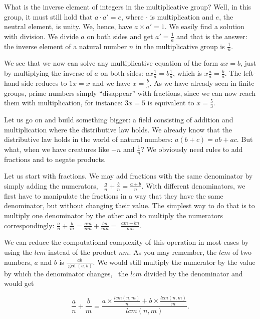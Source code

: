 \documentclass[tikz]{scrreprt}
\begin{document}
What is the inverse element of integers
in the multiplicative group?
Well, in this group, it must still hold
that $a \cdot a' = e$, where $\cdot$ is multiplication
and $e$, the neutral element, is unity.
We, hence, have $a \times a' = 1$.
We easily find a solution with division.
We divide $a$ on both sides and get $a' = \frac{1}{a}$
and that is the answer: 
the inverse element of a natural number $n$
in the multiplicative group
is $\frac{1}{n}$.

We see that we now can solve
any multiplicative equation of the form
$ax = b$, just by multiplying the inverse
of $a$ on both sides: $ax\frac{1}{a} = b \frac{1}{a}$,
which is $x\frac{a}{a} = \frac{b}{a}$.
The left-hand side reduces to $1x = x$
and we have $x = \frac{b}{a}$.
As we have already seen in finite groups,
prime numbers simply ``disappear'' with fractions,
since we can now reach them with multiplication,
for instance: $3x = 5$ is equivalent to
$x = \frac{5}{3}$.

Let us go on and build something bigger: a field
consisting of addition and multiplication
where the distributive law holds.
We already know that the distributive law
holds in the world of natural numbers:
$a(b + c) = ab + ac$.
But what, when we have creatures like $-n$ and 
$\frac{1}{n}$?
We obviously need rules to add fractions
and to negate products.

Let us start with fractions.
We may add fractions with the same denominator
by simply adding the numerators, \ie\
$\frac{a}{n} + \frac{b}{n} = \frac{a+b}{n}$.
With different denominators,
we first have to manipulate the fractions in a way
that they have the same denominator, but without 
changing their value.
The simplest way to do that
is to multiply one denominator by the other
and to multiply the numerators correspondingly:
$\frac{a}{n} + \frac{b}{m} = \frac{am}{nm} + \frac{bn}{mn} =$
$\frac{am+bn}{mn}$.

We can reduce the computational complexity
of this operation in most cases by using
the $lcm$ instead of the product $nm$.
As you may remember,
the $lcm$ of two numbers, $a$ and $b$ is 
$\frac{ab}{\gcd(a,b)}$.
We would still multiply the numerator 
by the value by which the denominator changes,
\ie\ the $lcm$ divided by the denominator and would get

\begin{equation}
\frac{a}{n} + \frac{b}{m} = 
\frac{a \times \frac{lcm(n,m)}{n} + b \times \frac{lcm(n,m)}{m}}{lcm(n,m)}.
\end{equation}
\end{document}

